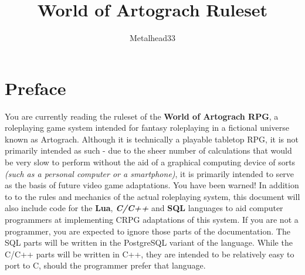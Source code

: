 \documentclass[openany,11pt,a4paper]{book}
\author{Metalhead33}
\title{World of Artograch Ruleset}
\begin{document}
\maketitle
\tableofcontents
\chapter*{Preface}
You are currently reading the ruleset of the \textbf{World of Artograch RPG}, a roleplaying game system intended for fantasy roleplaying in a fictional universe known as Artograch. Although it is technically a playable tabletop RPG, it is not primarily intended as such - due to the sheer number of calculations that would be very slow to perform without the aid of a graphical computing device of sorts \textit{(such as a personal computer or a smartphone)}, it is primarily intended to serve as the basis of future video game adaptations. You have been warned!\newline
In addition to to the rules and mechanics of the actual roleplaying system, this document will also include code for the \textbf{Lua},  \textbf{\textit{C/C++}} and \textbf{SQL} languages to aid computer programmers at implementing CRPG adaptations of this system. If you are not a programmer, you are expected to ignore those parts of the documentation. The SQL parts will be written in the PostgreSQL variant of the language. While the C/C++ parts will be written in C++, they are intended to be relatively easy to port to C, should the programmer prefer that language.
\end{document}
